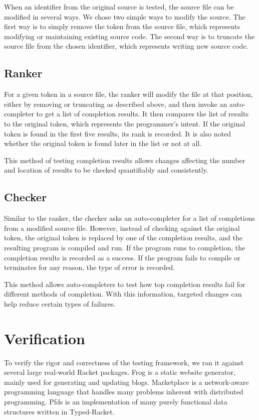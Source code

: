 \documentclass[ms,electronic,twosidetoc,letterpaper,chaptercenter,parttop,lol,lof,lot]{byumsphd}
\begin{document}
When an identifier from the original source is tested, the source file can be modified in several ways.
We chose two simple ways to modify the source.
The first way is to simply remove the token from the source file, which represents modifying or maintaining existing source code.
The second way is to truncate the source file from the chosen identifier, which represents writing new source code.

\section{Ranker}

For a given token in a source file, the ranker will modify the file at that position, either by removing or truncating as described above, and then invoke an auto-completer to get a list of completion results.
It then compares the list of results to the original token, which represents the programmer's intent.
If the original token is found in the first five results, its rank is recorded.
It is also noted whether the original token is found later in the list or not at all.

This method of testing completion results allows changes affecting the number and location of results to be checked quantifiably and consistently.

\section{Checker}

Similar to the ranker, the checker asks an auto-completer for a list of completions from a modified source file.
However, instead of checking against the original token, the original token is replaced by one of the completion results, and the resulting program is compiled and run.
If the program runs to completion, the completion results is recorded as a success.
If the program fails to compile or terminates for any reason, the type of error is recorded.

This method allows auto-completers to test how top completion results fail for different methods of completion.
With this information, targeted changes can help reduce certain types of failures.

\chapter{Verification}

To verify the rigor and correctness of the testing framework, we ran it against several large real-world Racket packages.
Frog is a static website generator, mainly used for generating and updating blogs.
Marketplace is a network-aware programming language that handles many problems inherent with distributed programming.
Pfds is an implementation of many purely functional data structures written in Typed-Racket.
\end{document}
